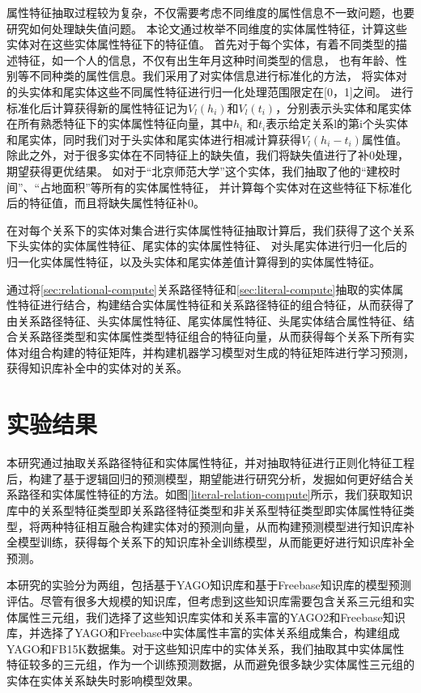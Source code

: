 属性特征抽取过程较为复杂，不仅需要考虑不同维度的属性信息不一致问题，也要研究如何处理缺失值问题。
本论文通过枚举不同维度的实体属性特征，计算这些实体对在这些实体属性特征下的特征值。
首先对于每个实体，有着不同类型的描述特征，如一个人的信息，不仅有出生年月这种时间类型的信息，
也有年龄、性别等不同种类的属性信息。我们采用了对实体信息进行标准化的方法，
将实体对的头实体和尾实体这些不同属性特征进行归一化处理范围限定在[0，1]之间。
进行标准化后计算获得新的属性特征记为$V_l(h_i)$和$V_l (t_i)$，分别表示头实体和尾实体在所有熟悉特征下的实体属性特征向量，其中$h_i$ 和$t_i$表示给定关系l的第i个头实体和尾实体，同时我们对于头实体和尾实体进行相减计算获得$V_l(h_i-t_i )$属性值。除此之外，对于很多实体在不同特征上的缺失值，我们将缺失值进行了补0处理，期望获得更优结果。
如对于“北京师范大学”这个实体，我们抽取了他的“建校时间”、“占地面积”等所有的实体属性特征，
并计算每个实体对在这些特征下标准化后的特征值，而且将缺失属性特征补0。

在对每个关系下的实体对集合进行实体属性特征抽取计算后，我们获得了这个关系下头实体的实体属性特征、尾实体的实体属性特征、
对头尾实体进行归一化后的归一化实体属性特征，以及头实体和尾实体差值计算得到的实体属性特征。

通过将\ref{sec:relational-compute}关系路径特征和\ref{sec:literal-compute}抽取的实体属性特征进行结合，构建结合实体属性特征和关系路径特征的组合特征，从而获得了由关系路径特征、头实体属性特征、尾实体属性特征、头尾实体结合属性特征、结合关系路径类型和实体属性类型特征组合的特征向量，从而获得每个关系下所有实体对组合构建的特征矩阵，并构建机器学习模型对生成的特征矩阵进行学习预测，获得知识库补全中的实体对的关系。


\section{实验结果}

本研究通过抽取关系路径特征和实体属性特征，并对抽取特征进行正则化特征工程后，构建了基于逻辑回归的预测模型，期望能进行研究分析，发掘如何更好结合关系路径和实体属性特征的方法。如图\ref{literal-relation-compute}所示，我们获取知识库中的关系型特征类型即关系路径特征类型和非关系型特征类型即实体属性特征类型，将两种特征相互融合构建实体对的预测向量，从而构建预测模型进行知识库补全模型训练，获得每个关系下的知识库补全训练模型，从而能更好进行知识库补全预测。


本研究的实验分为两组，包括基于YAGO知识库和基于Freebase知识库的模型预测评估。尽管有很多大规模的知识库，但考虑到这些知识库需要包含关系三元组和实体属性三元组，我们选择了这些知识库实体和关系丰富的YAGO2和Freebase知识库，并选择了YAGO和Freebase中实体属性丰富的实体关系组成集合，构建组成YAGO和FB15K数据集。对于这些知识库中的实体关系，我们抽取其中实体属性特征较多的三元组，作为一个训练预测数据，从而避免很多缺少实体属性三元组的实体在实体关系缺失时影响模型效果。


